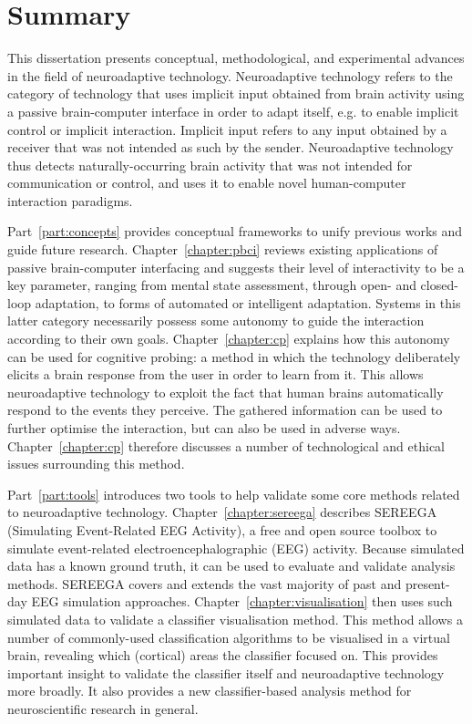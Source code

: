 \cleardoublepage%
%
\chapter*{Summary}

This dissertation presents conceptual, methodological, and experimental advances in the field of neuroadaptive technology. Neuroadaptive technology refers to the category of technology that uses implicit input obtained from brain activity using a passive brain-computer interface in order to adapt itself, e.g. to enable implicit control or implicit interaction. Implicit input refers to any input obtained by a receiver that was not intended as such by the sender. Neuroadaptive technology thus detects naturally-occurring brain activity that was not intended for communication or control, and uses it to enable novel human-computer interaction paradigms. 

Part~\ref{part:concepts} provides conceptual frameworks to unify previous works and guide future research. Chapter~\ref{chapter:pbci} reviews existing applications of passive brain-computer interfacing and suggests their level of interactivity to be a key parameter, ranging from mental state assessment, through open- and closed-loop adaptation, to forms of automated or intelligent adaptation. Systems in this latter category necessarily possess some autonomy to guide the interaction according to their own goals. Chapter~\ref{chapter:cp} explains how this autonomy can be used for cognitive probing: a method in which the technology deliberately elicits a brain response from the user in order to learn from it. This allows neuroadaptive technology to exploit the fact that human brains automatically respond to the events they perceive. The gathered information can be used to further optimise the interaction, but can also be used in adverse ways. Chapter~\ref{chapter:cp} therefore discusses a number of technological and ethical issues surrounding this method.

Part~\ref{part:tools} introduces two tools to help validate some core methods related to neuroadaptive technology. Chapter~\ref{chapter:sereega} describes SEREEGA (Simulating Event-Related EEG Activity), a free and open source toolbox to simulate event-related electroencephalographic (EEG) activity. Because simulated data has a known ground truth, it can be used to evaluate and validate analysis methods. SEREEGA covers and extends the vast majority of past and present-day EEG simulation approaches. Chapter~\ref{chapter:visualisation} then uses such simulated data to validate a classifier visualisation method. This method allows a number of commonly-used classification algorithms to be visualised in a virtual brain, revealing which (cortical) areas the classifier focused on. This provides important insight to validate the classifier itself and neuroadaptive technology more broadly. It also provides a new classifier-based analysis method for neuroscientific research in general.

